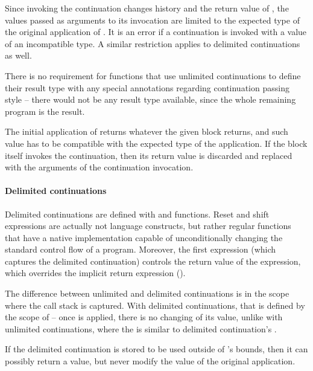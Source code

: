 Since invoking the continuation changes history and the return value of , the values passed as arguments to its invocation are limited to the expected type of the original application of . It is an error if a continuation is invoked with a value of an incompatible type. A similar restriction applies to delimited continuations as well. 

There is no requirement for functions that use unlimited continuations to define their result type with any special annotations regarding continuation passing style -- there would not be any result type available, since the whole remaining program is the result. 

The initial application of  returns whatever the given block returns, and such value has to be compatible with the expected type of the  application. If the block itself invokes the continuation, then its return value is discarded and replaced with the arguments of the continuation invocation. 







\paragraph{Delimited continuations}

Delimited continuations are defined with  and  functions. Reset and shift expressions are actually not language constructs, but rather regular functions that have a native implementation capable of unconditionally changing the standard control flow of a program. Moreover, the first  expression (which captures the delimited continuation) controls the return value of the  expression, which overrides the implicit return expression ().

The difference between unlimited and delimited continuations is in the scope where the call stack is captured. With delimited continuations, that is defined by the scope of  -- once  is applied, there is no changing of its value, unlike with unlimited continuations, where the  is similar to delimited continuation's . 

If the delimited continuation is stored to be used outside of 's bounds, then it can possibly return a value, but never modify the value of the original  application.

